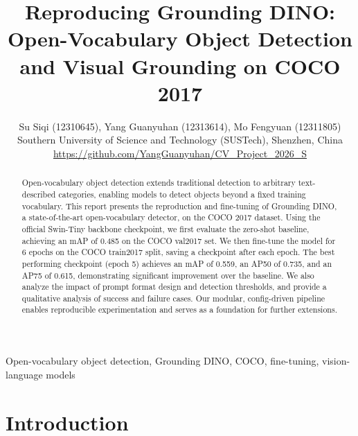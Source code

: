\documentclass[10pt,journal,final,twocolumn]{IEEEtran}
\begin{document}
\title{Reproducing Grounding DINO: Open-Vocabulary Object Detection and Visual Grounding on COCO 2017}

\author{
    Su Siqi (12310645), Yang Guanyuhan (12313614), Mo Fengyuan (12311805)\\
   Southern University of Science and Technology (SUSTech), Shenzhen, China\\[4pt]
    {\small\url{https://github.com/YangGuanyuhan/CV\_Project\_2026\_S}}
}

\maketitle


\begin{abstract}
Open-vocabulary object detection extends traditional detection to arbitrary text-described categories, enabling models to detect objects beyond a fixed training vocabulary. This report presents the reproduction and fine-tuning of Grounding DINO, a state-of-the-art open-vocabulary detector, on the COCO 2017 dataset. Using the official Swin-Tiny backbone checkpoint, we first evaluate the zero-shot baseline, achieving an mAP of 0.485 on the COCO val2017 set. We then fine-tune the model for 6 epochs on the COCO train2017 split, saving a checkpoint after each epoch. The best performing checkpoint (epoch 5) achieves an mAP of 0.559, an AP50 of 0.735, and an AP75 of 0.615, demonstrating significant improvement over the baseline. We also analyze the impact of prompt format design and detection thresholds, and provide a qualitative analysis of success and failure cases. Our modular, config-driven pipeline enables reproducible experimentation and serves as a foundation for further extensions.
\end{abstract}

\begin{IEEEkeywords}
Open-vocabulary object detection, Grounding DINO, COCO, fine-tuning, vision-language models
\end{IEEEkeywords}

\section{Introduction}
\end{document}
